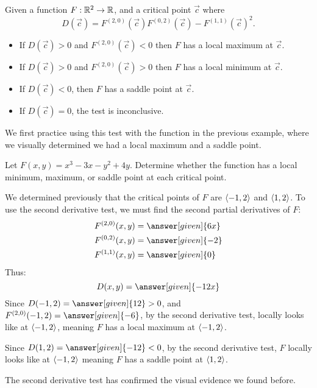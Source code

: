 \documentclass{ximera}
\begin{document}
\begin{theorem}
  Given a function $F:\mathbb R^2\to \mathbb R$, and a critical point $\vec{c}$ where
  \[
  D(\vec{c}) = F^{(2,0)}(\vec{c})F^{(0,2)}(\vec{c})-F^{(1,1)}(\vec{c})^2.
  \]
  \begin{itemize}
  \item If $D(\vec{c})>0$ and $F^{(2,0)}(\vec{c})<0$ then $F$ has  a local maximum at $\vec{c}$.
  \item If $D(\vec{c})>0$ and $F^{(2,0)}(\vec{c})>0$ then $F$ has a local minimum at $\vec{c}$.
  \item	If $D(\vec{c})<0$, then $F$ has a saddle point at $\vec{c}$.
  \item If $D(\vec{c})=0$, the test is inconclusive.
  \end{itemize}
\end{theorem}

We first practice using this test with the function in the previous
example, where we visually determined we had a local maximum and a
saddle point.

\begin{example}
  Let $F(x,y) = x^3-3x-y^2+4y$. Determine whether the function has a
  local minimum, maximum, or saddle point at each critical point.
  \begin{explanation}
    We determined previously that the critical points of $F$ are
    $\left\langle -1,2\right\rangle$ and $\left\langle 1,2\right\rangle$. To use the second derivative
    test, we must find the second partial derivatives of $F$:
    \begin{align*}
      F^{(2,0)}(x,y) &= \answer[given]{6x}\\
      F^{(0,2)}(x,y) &= \answer[given]{-2}\\
      F^{(1,1)}(x,y) &= \answer[given]{0}
    \end{align*}
    Thus:
    \[
    D(x,y) = \answer[given]{-12x}
    \]
    Since $D(-1,2) = \answer[given]{12}>0$, and $F^{(2,0)}(-1,2) =
    \answer[given]{-6}$, by the second derivative test, locally looks
    like  at $\left\langle -1,2\right\rangle$, meaning $F$ has a
    local maximum at $\left\langle -1,2\right\rangle$.
    
    Since $D(1,2) = \answer[given]{-12} <0$, by the second derivative
    test, $F$ locally looks like  at
    $\left\langle -1,2\right\rangle$ meaning $F$ has a saddle point at $\left\langle 1,2\right\rangle$.
    
    The second derivative test has confirmed the visual evidence we
    found before.
  \end{explanation}
\end{example}
\end{document}
